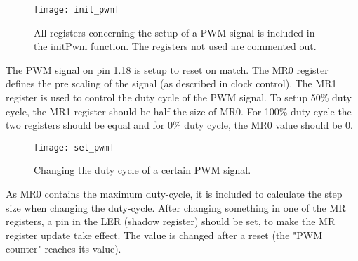 \begin{figure}[h!]		%
	\begin{centering}
 		\texttt{[image: init\_pwm]}
		\caption{All registers concerning the setup of a PWM signal is included in the initPwm function. The registers not used are
		commented out.}
	\end{centering}
\end{figure}
\newpage
The PWM signal on pin 1.18 is setup to reset on match. The MR0 register defines the pre scaling of the signal (as described in clock control).
The MR1 register is used to control the duty cycle of the PWM signal. To setup 50\% duty cycle, the MR1 register should be half the size of
MR0. For 100\% duty cycle the two registers should be equal and for 0\% duty cycle, the MR0 value should be 0.

\begin{figure}[h!]		%
	\begin{centering}
 		\texttt{[image: set\_pwm]}
		\caption{Changing the duty cycle of a certain PWM signal.}
	\end{centering}
\end{figure}
As MR0 contains the maximum duty-cycle, it is included to calculate the step size when changing the duty-cycle.
After changing something in one of the MR registers, a pin in the LER (shadow register) should be set, to make the MR register update take effect. The value is changed after a reset (the "PWM counter" reaches its value).


